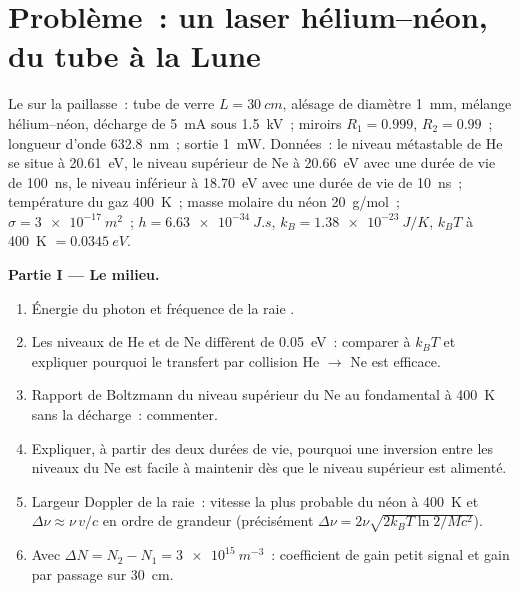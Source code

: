 \section{Problème~: un laser hélium--néon, du tube à la Lune}

\begin{problem}\label{pb:b2:laser:1}
Le  sur la paillasse~: tube de verre $L = \qty{30}{cm}$, alésage de diamètre
\qty{1}{mm}, mélange hélium--néon, décharge de \qty{5}{mA} sous
\qty{1.5}{kV}~; miroirs $R_1 = 0.999$, $R_2 = 0.99$~; longueur d'onde
\qty{632.8}{nm}~; sortie \qty{1}{mW}. Données~: le niveau métastable de He se situe
à \qty{20.61}{eV}, le niveau  supérieur de Ne à \qty{20.66}{eV} avec une
durée de vie de \qty{100}{ns}, le niveau  inférieur à \qty{18.70}{eV} avec une
durée de vie de \qty{10}{ns}~; température du gaz \qty{400}{K}~; masse molaire du néon
\qty{20}{g/mol}~;  $\sigma = \qty{3e-17}{m^2}$~; $h =
\qty{6.63e-34}{J.s}$, $k_B = \qty{1.38e-23}{J/K}$, $k_BT$ à \qty{400}{K}
$= \qty{0.0345}{eV}$.

\textbf{Partie I --- Le milieu.}
\begin{enumerate}
  \item Énergie du photon et fréquence de la raie .
  \item Les niveaux de He et de Ne diffèrent de \qty{0.05}{eV}~: comparer à
        $k_BT$ et expliquer pourquoi le transfert par collision He $\to$ Ne est
        efficace.
  \item Rapport de Boltzmann du niveau supérieur du Ne au fondamental à
        \qty{400}{K} sans la décharge~: commenter.
  \item Expliquer, à partir des deux durées de vie, pourquoi une inversion entre les
        niveaux du Ne est facile à maintenir dès que le niveau supérieur est alimenté.
  \item Largeur Doppler de la raie~: vitesse la plus probable du néon à
        \qty{400}{K} et $\Delta\nu \approx \nu\,v/c$ en ordre de
        grandeur (précisément $\Delta\nu = 2\nu\sqrt{2k_BT\ln2/Mc^2}$).
  \item Avec $\Delta N = N_2 - N_1 = \qty{3e15}{m^{-3}}$~: coefficient de gain
        petit signal et gain par passage sur \qty{30}{cm}.
\end{enumerate}


\end{problem}
